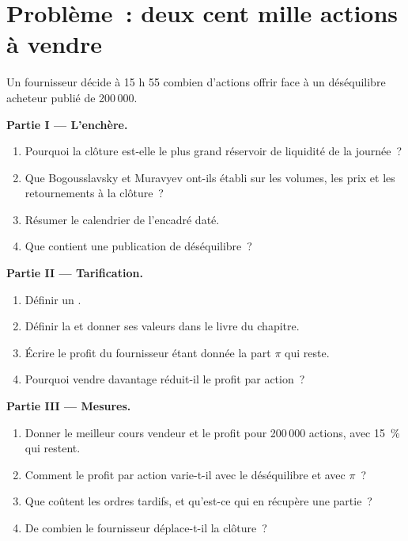 \section{Problème~: deux cent mille actions à vendre}

\begin{problem}\label{pb:hf:auctions-and-the-close:1}
Un fournisseur décide à 15 h 55 combien d'actions offrir face à un déséquilibre acheteur publié de 200\,000.

\medskip\noindent\textbf{Partie I --- L'enchère.}
\begin{enumerate}
\item Pourquoi la clôture est-elle le plus grand réservoir de liquidité de la journée~?
\item Que Bogousslavsky et Muravyev ont-ils établi sur les volumes, les prix et les retournements à la clôture~?
\item Résumer le calendrier de l'encadré daté.
\item Que contient une publication de déséquilibre~?
\end{enumerate}

\medskip\noindent\textbf{Partie II --- Tarification.}
\begin{enumerate}[resume]
\item Définir un .
\item Définir la  et donner ses valeurs dans le livre du chapitre.
\item Écrire le profit du fournisseur étant donnée la part $\pi$ qui reste.
\item Pourquoi vendre davantage réduit-il le profit par action~?
\end{enumerate}

\medskip\noindent\textbf{Partie III --- Mesures.}
\begin{enumerate}[resume]
\item Donner le meilleur cours vendeur et le profit pour 200\,000 actions, avec 15~\% qui restent.
\item Comment le profit par action varie-t-il avec le déséquilibre et avec $\pi$~?
\item Que coûtent les ordres tardifs, et qu'est-ce qui en récupère une partie~?
\item De combien le fournisseur déplace-t-il la clôture~?
\end{enumerate}


\end{problem}
